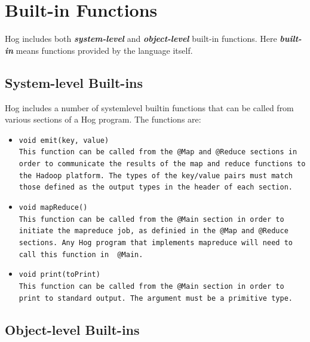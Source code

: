 \documentclass{article}
\begin{document}

\section{Built-in Functions} %
\label{sec:built_in_functions}

Hog includes both \emph{\textbf{system-level}} and \emph{\textbf{object-level}}
built-in functions. Here \emph{\textbf{built-in}} means functions provided by the
language itself.

\subsection{System-level Built-ins} %
\label{sub:system_level_built_ins}

Hog includes a number of system­level built­in functions that can be called from
various sections of a Hog program. The functions are:

\begin{itemize} 

\item[] \tt void emit(key, value) \rm \\

This function can be called from the \tt @Map \rm and \tt @Reduce \rm sections in
order to communicate the results of the map and reduce functions to the Hadoop
platform. The types of the key/value pairs must match those defined as the output
types in the header of each section.

\item[] \tt void mapReduce() \rm \\

This function can be called from the \tt @Main \rm section in order to initiate
the mapreduce job, as definied in the \tt @Map \rm and \tt @Reduce \rm sections.
Any Hog program that implements mapreduce will need to call this function in \tt
@Main\rm.

\item[] \tt void print(toPrint) \rm \\

This function can be called from the \tt @Main \rm section in order to print to
standard output. The argument must be a primitive type.

\end{itemize}


\subsection{Object-level Built-ins} %
\label{sub:object_level_built_ins}
\end{document}
